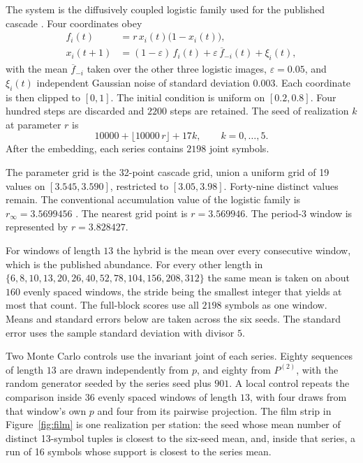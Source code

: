 \documentclass[11pt,a4paper]{article}
\begin{document}
The system is the diffusively coupled logistic family used for the
published cascade \citep{Kaneko1992,Padilla2026framework}. Four
coordinates obey
\begin{equation}
\label{eq:map}
\begin{aligned}
f_i(t)&=r\,x_i(t)\bigl(1-x_i(t)\bigr),\\
x_i(t+1)
&=(1-\varepsilon)\,f_i(t)
+\varepsilon\,\overline{f}_{-i}(t)
+\xi_i(t),
\end{aligned}
\end{equation}
with the mean $\overline{f}_{-i}$ taken over the other three logistic
images, $\varepsilon=0.05$, and $\xi_i(t)$ independent Gaussian noise of
standard deviation $0.003$. Each coordinate is then clipped to $[0,1]$.
The initial condition is uniform on $[0.2,0.8]$. Four hundred steps are
discarded and $2200$ steps are retained. The seed of realization $k$ at
parameter $r$ is
\begin{equation}
\label{eq:seed}
10000+\lfloor 10000\,r\rfloor+17k,
\qquad k=0,\ldots,5.
\end{equation}
After the embedding, each series contains $2198$ joint symbols.

The parameter grid is the 32-point cascade grid, union a uniform grid of
19 values on $[3.545,3.590]$, restricted to $[3.05,3.98]$. Forty-nine
distinct values remain. The conventional accumulation value of the
logistic family is $r_\infty=3.5699456$
\citep{Feigenbaum1978,Feigenbaum1983}. The nearest grid point is
$r=3.569946$. The period-3 window is represented by $r=3.828427$.

For windows of length $13$ the hybrid is the mean over every consecutive
window, which is the published abundance. For every other length in
$\{6,8,10,13,20,26,40,52,78,104,156,208,312\}$
the same mean is taken on about $160$ evenly spaced windows, the stride
being the smallest integer that yields at most that count. The full-block
scores use all $2198$ symbols as one window. Means and standard errors
below are taken across the six seeds. The standard error uses the sample
standard deviation with divisor $5$.

Two Monte Carlo controls use the invariant joint of each series. Eighty
sequences of length $13$ are drawn independently from $p$, and eighty from
$P^{(2)}$, with the random generator seeded by the series seed plus $901$.
A local control repeats the comparison inside $36$ evenly spaced windows
of length $13$, with four draws from that window's own $p$ and four from
its pairwise projection. The film strip in Figure~\ref{fig:film} is one
realization per station: the seed whose mean number of distinct 13-symbol
tuples is closest to the six-seed mean, and, inside that series, a run of
16 symbols whose support is closest to the series mean.
\end{document}
